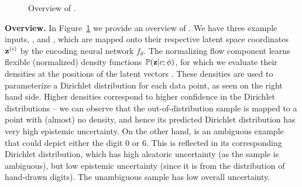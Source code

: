 \begin{figure}
    \vspace{-.3cm}
	\caption{Overview of \ours.}
	\label{fig:overview}
	\vspace{-.5cm}
\end{figure}

\textbf{Overview.} In Figure~\ref{fig:overview} we provide an overview of \ours. We have three example inputs,  , and , which are mapped onto their respective latent space coordinates $\latent\dataix$ by the encoding neural network $f_\theta$. The normalizing flow component learns flexible (normalized) density functions $\mathbb{P}(\bold{z}|c;\phi)$, for which we evaluate their densities at the positions of the latent vectors \smash{$\latent\dataix$}. These densities are used to parameterize a Dirichlet distribution for each data point, as seen on the right hand side. Higher densities correspond to higher confidence in the Dirichlet distributions -- we can observe that the out-of-distribution sample  is mapped to a point with (almost) no density, and hence its predicted Dirichlet distribution has very high epistemic uncertainty. On the other hand,  is an ambiguous example that could depict either the digit 0 or 6. This is reflected in its corresponding Dirichlet distribution, which has high aleatoric uncertainty (as the sample is ambiguous), but low epistemic uncertainty (since it is from the distribution of hand-drawn digits). The unambiguous sample  has low overall uncertainty.

